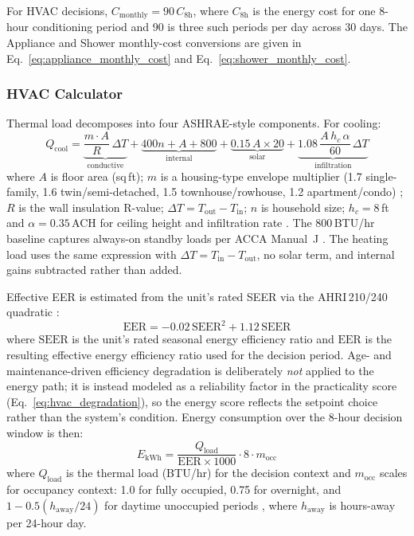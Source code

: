 \documentclass[final,3p,times]{elsarticle}
\begin{document}
\noindent For HVAC decisions, $C_{\mathrm{monthly}} = 90\,C_{\mathrm{8h}}$, where $C_{\mathrm{8h}}$ is the energy cost for one 8-hour conditioning period and 90 is three such periods per day across 30 days. The Appliance and Shower monthly-cost conversions are given in Eq.~\ref{eq:appliance_monthly_cost} and Eq.~\ref{eq:shower_monthly_cost}.

\subsubsection{HVAC Calculator}
Thermal load decomposes into four ASHRAE-style components. For cooling:
\begin{equation}
  Q_{\mathrm{cool}} =
    \underbrace{\frac{m \cdot A}{R}\,\Delta T}_{\text{conductive}}
    +\underbrace{400n + A + 800}_{\text{internal}}
    +\underbrace{0.15\,A \times 20}_{\text{solar}}
    +\underbrace{1.08\,\frac{A\, h_c\, \alpha}{60}\,\Delta T}_{\text{infiltration}}
  \label{eq:hvac_cooling_load}
\end{equation}
\noindent where $A$ is floor area (sq\,ft); $m$ is a housing-type envelope multiplier (1.7 single-family, 1.6 twin/semi-detached, 1.5 townhouse/rowhouse, 1.2 apartment/condo) \cite{accamanualj}; $R$ is the wall insulation R-value; $\Delta T = T_{\mathrm{out}} - T_{\mathrm{in}}$; $n$ is household size; $h_c = 8$\,ft and $\alpha = 0.35$\,ACH for ceiling height and infiltration rate \cite{polly2011}. The 800\,BTU/hr baseline captures always-on standby loads per ACCA Manual~J \cite{accamanualj}. The heating load uses the same expression with $\Delta T = T_{\mathrm{in}} - T_{\mathrm{out}}$, no solar term, and internal gains subtracted rather than added.

Effective EER is estimated from the unit's rated SEER via the AHRI\,210/240 quadratic \cite{ahri2008}:
\begin{equation}
  \mathrm{EER} = -0.02\,\mathrm{SEER}^{2} + 1.12\,\mathrm{SEER}
  \label{eq:eer_quadratic}
\end{equation}
\noindent where $\mathrm{SEER}$ is the unit's rated seasonal energy efficiency ratio and $\mathrm{EER}$ is the resulting effective energy efficiency ratio used for the decision period. Age- and maintenance-driven efficiency degradation is deliberately \emph{not} applied to the energy path; it is instead modeled as a reliability factor in the practicality score (Eq.~\ref{eq:hvac_degradation}), so the energy score reflects the setpoint choice rather than the system's condition. Energy consumption over the 8-hour decision window is then:
\begin{equation}
  E_{\mathrm{kWh}} =
    \frac{Q_{\mathrm{load}}}{\mathrm{EER} \times 1000}
    \cdot 8 \cdot m_{\mathrm{occ}}
  \label{eq:hvac_energy}
\end{equation}
\noindent where $Q_{\mathrm{load}}$ is the thermal load (BTU/hr) for the decision context and $m_{\mathrm{occ}}$ scales for occupancy context: 1.0 for fully occupied, 0.75 for overnight, and $1 - 0.5(h_{\mathrm{away}}/24)$ for daytime unoccupied periods \cite{houde2021}, where $h_{\mathrm{away}}$ is hours-away per 24-hour day.
\end{document}
